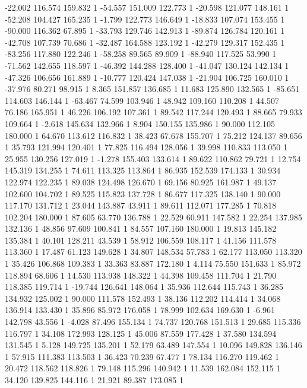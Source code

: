 	-22.002 116.574 159.832 1
	-54.557 151.009 122.773 1
	-20.598 121.077 148.161 1
	-52.208 104.427 165.235 1
	-1.799 122.773 146.649 1
	-18.833 107.074 153.455 1
	-90.000 116.362 67.895 1
	-33.793 129.746 142.913 1
	-89.874 126.784 120.161 1
	-42.708 107.739 70.686 1
	-32.487 164.588 123.192 1
	-42.279 129.317 152.435 1
	-83.256 117.880 122.246 1
	-58.258 89.565 89.909 1
	-88.940 117.525 53.990 1
	-71.562 142.655 118.597 1
	-46.392 144.288 128.400 1
	-41.047 130.124 142.134 1
	-47.326 106.656 161.889 1
	-10.777 120.424 147.038 1
	-21.904 106.725 160.010 1
	-37.976 80.271 98.915 1
	8.365 151.857 136.685 1
	11.683 125.890 132.565 1
	-85.651 114.603 146.144 1
	-63.467 74.599 103.946 1
	48.942 109.160 110.208 1
	44.507 76.186 165.951 1
	46.226 106.192 107.361 1
	89.542 117.244 120.493 1
	88.665 79.933 109.664 1
	-2.618 145.634 132.966 1
	8.904 150.155 135.986 1
	90.000 112.105 180.000 1
	64.670 113.612 116.832 1
	38.423 67.678 155.707 1
	75.212 124.137 89.656 1
	35.793 121.994 120.401 1
	77.825 116.494 128.056 1
	39.998 110.833 113.050 1
	25.955 130.256 127.019 1
	-1.278 155.403 133.614 1
	89.622 110.862 79.721 1
	12.754 145.319 134.255 1
	74.611 113.325 113.864 1
	86.935 152.539 174.133 1
	30.934 122.974 122.235 1
	89.038 124.498 126.670 1
	69.156 80.925 161.987 1
	49.137 102.600 104.702 1
	89.525 115.823 137.728 1
	86.677 117.325 138.140 1
	90.000 117.170 131.712 1
	23.044 143.887 43.911 1
	89.611 112.071 177.285 1
	70.818 102.204 180.000 1
	87.605 63.770 136.788 1
	22.529 60.911 147.582 1
	22.254 137.985 132.136 1
	48.856 97.609 100.841 1
	84.557 107.160 180.000 1
	19.813 145.182 135.384 1
	40.101 128.211 43.539 1
	58.912 106.559 108.117 1
	41.156 111.578 113.360 1
	17.487 61.123 149.628 1
	34.807 148.534 57.783 1
	62.177 113.050 113.320 1
	35.426 106.868 109.383 1
	33.363 83.887 172.180 1
	4.114 75.550 151.633 1
	85.972 118.894 68.606 1
	14.530 113.938 148.322 1
	44.398 109.458 111.704 1
	21.790 118.385 119.714 1
	-19.744 126.641 148.064 1
	35.936 112.644 115.743 1
	36.285 134.932 125.002 1
	90.000 111.578 152.493 1
	38.136 112.202 114.414 1
	34.068 136.914 133.430 1
	35.896 85.972 176.058 1
	78.999 102.634 169.630 1
	-6.961 142.798 43.556 1
	-4.028 87.496 155.134 1
	74.737 120.768 151.513 1
	29.685 115.336 116.797 1
	34.108 172.993 128.125 1
	45.006 87.559 177.428 1
	37.580 134.594 131.545 1
	5.128 149.725 135.201 1
	52.179 63.489 147.554 1
	10.096 149.828 136.146 1
	57.915 111.383 113.503 1
	36.423 70.239 67.477 1
	78.134 116.270 119.462 1
	20.472 118.562 118.826 1
	79.148 115.296 140.942 1
	11.539 162.084 152.115 1
	34.120 139.825 144.116 1
	21.921 89.387 173.085 1
